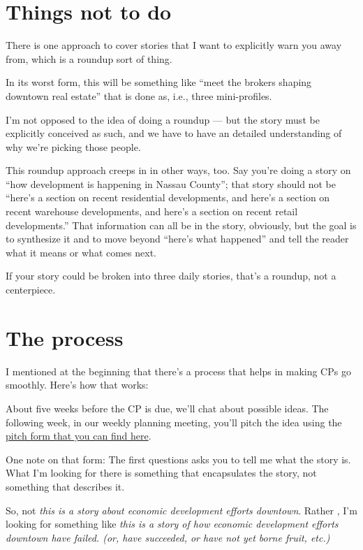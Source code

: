 \documentclass[
  11pt,
  american,
  letterpaperpaper,
  extrafontsizes,onecolumn,openright
  ]{memoir}
\begin{document}
\hypertarget{things-not-to-do}{%
\section*{Things not to do}\label{things-not-to-do}}

There is one approach to cover stories that I want to explicitly warn you away from, which is a roundup sort of thing.

In its worst form, this will be something like \enquote{meet the brokers shaping downtown real estate} that is done as, i.e., three mini-profiles.

I'm not opposed to the idea of doing a roundup --- but the story must be explicitly conceived as such, and we have to have an detailed understanding of why we're picking those people.

This roundup approach creeps in in other ways, too. Say you're doing a story on \enquote{how development is happening in Nassau County}; that story should not be \enquote{here's a section on recent residential developments, and here's a section on recent warehouse developments, and here's a section on recent retail developments.} That information can all be in the story, obviously, but the goal is to synthesize it and to move beyond \enquote{here's what happened} and tell the reader what it means or what comes next.

If your story could be broken into three daily stories, that's a roundup, not a centerpiece.

\hypertarget{the-process}{%
\section*{The process}\label{the-process}}

I mentioned at the beginning that there's a process that helps in making CPs go smoothly. Here's how that works:

About five weeks before the CP is due, we'll chat about possible ideas. The following week, in our weekly planning meeting, you'll pitch the idea using the \href{https://bizj.us/1qk3qi}{pitch form that you can find here}.

One note on that form: The first questions asks you to tell me what the story is. What I'm looking for there is something that encapsulates the story, not something that describes it.

So, not \emph{this is a story about economic development efforts downtown}. Rather , I'm looking for something like \emph{this is a story of how economic development efforts downtown have failed. (or, have succeeded, or have not yet borne fruit, etc.)}
\end{document}
